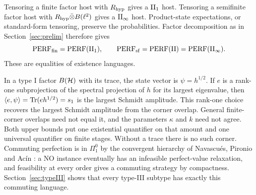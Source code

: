 Tensoring a finite factor host with $R_{\rm hyp}$ gives a $\mathrm{II}_1$ host. Tensoring a semifinite factor host with $R_{\rm hyp}\bar\otimes B(\ell^2)$ gives a $\mathrm{II}_\infty$ host. Product-state expectations, or standard-form tensoring, preserve the probabilities. Factor decomposition as in Section~\ref{sec:prelim} therefore gives
\begin{equation}\label{eq:languageequal}
 \mathrm{PERF}_{\mathrm{fin}}=\mathrm{PERF}(\mathrm{II}_1),\qquad
 \mathrm{PERF}_{\mathrm{sf}}=\mathrm{PERF}(\mathrm{II})=\mathrm{PERF}(\mathrm{II}_\infty).
\end{equation}
These are equalities of existence languages.

\begin{remark}
In a type I factor $B(\mathcal H)$ with its trace, the state vector is $\psi=h^{1/2}$. If $e$ is a rank-one subprojection of the spectral projection of $h$ for its largest eigenvalue, then $\langle e,\psi\rangle=\operatorname{Tr}(eh^{1/2})=s_1$ is the largest Schmidt amplitude. This rank-one choice recovers the largest Schmidt amplitude from the corner overlap. General finite-corner overlaps need not equal it, and the parameters $\kappa$ and $k$ need not agree. Both upper bounds put one existential quantifier on that amount and one universal quantifier on finite stages. Without a trace there is no such corner. Commuting perfection is in $\Pi^0_1$ by the convergent hierarchy of Navascu\'es, Pironio and Ac\'in \cite{NPA}: a NO instance eventually has an infeasible perfect-value relaxation, and feasibility at every order gives a commuting strategy by compactness. Section~\ref{sec:typeIII} shows that every type-III subtype has exactly this commuting language.
\end{remark}
